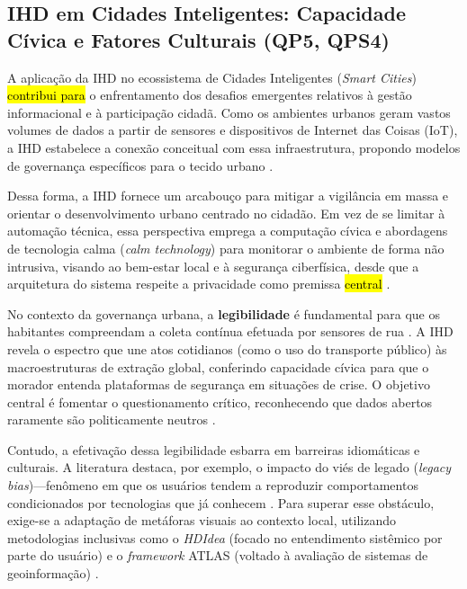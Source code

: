 \documentclass[12pt]{article}
\newcommand{\hlcite}[1]{\colorbox{yellow}{\cite{#1}}} %
\begin{document}
{{    \subsection{IHD em Cidades Inteligentes: Capacidade Cívica e Fatores Culturais (QP5, QPS4)}

    A aplicação da IHD no ecossistema de Cidades Inteligentes (\textit{Smart Cities}) \hl{contribui para} o enfrentamento dos desafios emergentes relativos à gestão informacional e à participação cidadã. Como os ambientes urbanos geram vastos volumes de dados a partir de sensores e dispositivos de Internet das Coisas (IoT), a IHD estabelece a conexão conceitual com essa infraestrutura, propondo modelos de governança específicos para o tecido urbano \hlcite{Mashhadi2014, Chowdhury2016, barcellos2022towards}.

    Dessa forma, a IHD fornece um arcabouço para mitigar a vigilância em massa e orientar o desenvolvimento urbano centrado no cidadão. Em vez de se limitar à automação técnica, essa perspectiva emprega a computação cívica e abordagens de tecnologia calma (\textit{calm technology}) para monitorar o ambiente de forma não intrusiva, visando ao bem-estar local e à segurança ciberfísica, desde que a arquitetura do sistema respeite a privacidade como premissa \hl{central} \hlcite{Konomi2022, Chowdhury2016}.

    No contexto da governança urbana, a \textbf{legibilidade} é fundamental para que os habitantes compreendam a coleta contínua efetuada por sensores de rua \cite{Coleti2019DesigPatterns, Hutton2017}. A IHD revela o espectro que une atos cotidianos (como o uso do transporte público) às macroestruturas de extração global, conferindo capacidade cívica para que o morador entenda plataformas de segurança em situações de crise. O objetivo central é fomentar o questionamento crítico, reconhecendo que dados abertos raramente são politicamente neutros \hlcite{Parviainen2016, Lenzi2024, barcellos2022towards}.

    Contudo, a efetivação dessa legibilidade esbarra em barreiras idiomáticas e culturais. A literatura destaca, por exemplo, o impacto do viés de legado (\textit{legacy bias})---fenômeno em que os usuários tendem a reproduzir comportamentos condicionados por tecnologias que já conhecem \hlcite{Friedman2024}. Para superar esse obstáculo, exige-se a adaptação de metáforas visuais ao contexto local, utilizando metodologias inclusivas como o \textit{HDIdea} (focado no entendimento sistêmico por parte do usuário) \hlcite{Strey2019Human} e o \textit{framework} ATLAS (voltado à avaliação de sistemas de geoinformação) \hlcite{Capeleti2024Human}.

}}
\end{document}
